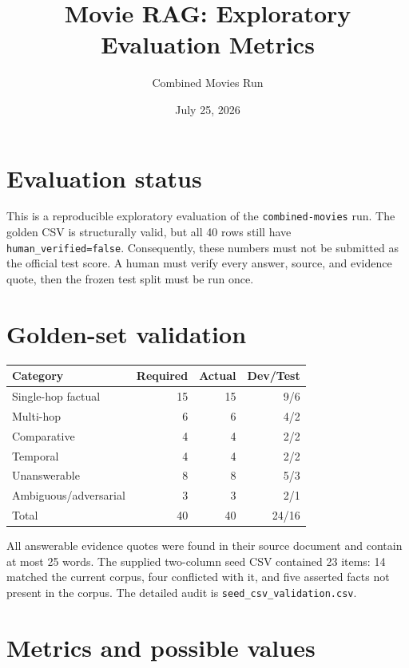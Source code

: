 \documentclass[11pt]{article}
\title{Movie RAG: Exploratory Evaluation Metrics}
\author{Combined Movies Run}
\date{July 25, 2026}
\begin{document}
\maketitle

\section{Evaluation status}

This is a reproducible exploratory evaluation of the
\texttt{combined-movies} run. The golden CSV is structurally valid, but all
40 rows still have \texttt{human\_verified=false}. Consequently, these numbers
must not be submitted as the official test score. A human must verify every
answer, source, and evidence quote, then the frozen test split must be run once.

\section{Golden-set validation}

\begin{center}
\begin{tabular}{lrrr}
\hline
Category & Required & Actual & Dev/Test \\
\hline
Single-hop factual & 15 & 15 & 9/6 \\
Multi-hop & 6 & 6 & 4/2 \\
Comparative & 4 & 4 & 2/2 \\
Temporal & 4 & 4 & 2/2 \\
Unanswerable & 8 & 8 & 5/3 \\
Ambiguous/adversarial & 3 & 3 & 2/1 \\
\hline
Total & 40 & 40 & 24/16 \\
\hline
\end{tabular}
\end{center}

All answerable evidence quotes were found in their source document and contain
at most 25 words. The supplied two-column seed CSV contained 23 items:
14 matched the current corpus, four conflicted with it, and five asserted facts
not present in the corpus. The detailed audit is
\texttt{seed\_csv\_validation.csv}.

\section{Metrics and possible values}
\end{document}
